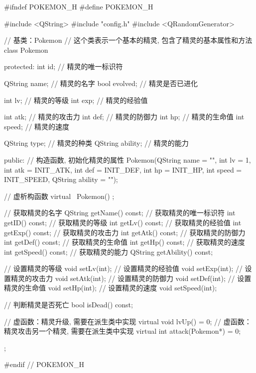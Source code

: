 \begin{cppcode}
    #ifndef POKEMON_H
    #define POKEMON_H

    #include <QString>
    #include "config.h"
    #include <QRandomGenerator>

    // 基类：Pokemon
    // 这个类表示一个基本的精灵, 包含了精灵的基本属性和方法
    class Pokemon {
            protected:
            int id; // 精灵的唯一标识符

            QString name; // 精灵的名字
            bool evolved; // 精灵是否已进化

            int lv; // 精灵的等级
            int exp; // 精灵的经验值

            int atk; // 精灵的攻击力
            int def; // 精灵的防御力
            int hp; // 精灵的生命值
            int speed; // 精灵的速度

            QString type; // 精灵的种类
            QString ability; // 精灵的能力

            public:
            // 构造函数, 初始化精灵的属性
            Pokemon(QString name = "", int lv = 1, int atk = INIT_ATK, int def = INIT_DEF, int hp = INIT_HP, int speed = INIT_SPEED, QString ability = "");

            // 虚析构函数
            virtual ~Pokemon() {};

            // 获取精灵的名字
            QString getName() const;
            // 获取精灵的唯一标识符
            int getID() const;
            // 获取精灵的等级
            int getLv() const;
            // 获取精灵的经验值
            int getExp() const;
            // 获取精灵的攻击力
            int getAtk() const;
            // 获取精灵的防御力
            int getDef() const;
            // 获取精灵的生命值
            int getHp() const;
            // 获取精灵的速度
            int getSpeed() const;
            // 获取精灵的能力
            QString getAbility() const;

            // 设置精灵的等级
            void setLv(int);
            // 设置精灵的经验值
            void setExp(int);
            // 设置精灵的攻击力
            void setAtk(int);
            // 设置精灵的防御力
            void setDef(int);
            // 设置精灵的生命值
            void setHp(int);
            // 设置精灵的速度
            void setSpeed(int);

            // 判断精灵是否死亡
            bool isDead() const;

            // 虚函数：精灵升级, 需要在派生类中实现
            virtual void lvUp() = 0;
            // 虚函数：精灵攻击另一个精灵, 需要在派生类中实现
            virtual int attack(Pokemon*) = 0;
        };

    #endif // POKEMON_H
\end{cppcode}

